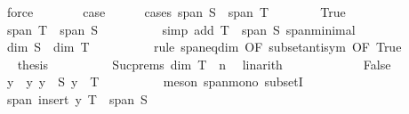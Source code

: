 \begin{isabellebody}
\ force\isanewline
\ \ \ \ \isamarkupfalse%
\ \isamarkupfalse%
\ {\isacharquery}{\kern0pt}case\isanewline
\ \ \ \ \isamarkupfalse%
\ {\isacharparenleft}{\kern0pt}cases\ {\isachardoublequoteopen}span\ S\ {\isasymsubseteq}\ span\ T{\isachardoublequoteclose}{\isacharparenright}{\kern0pt}\isanewline
\ \ \ \ \ \ \isamarkupfalse%
\ True\isanewline
\ \ \ \ \ \ \isamarkupfalse%
\ {\isachardoublequoteopen}span\ T\ {\isasymsubseteq}\ span\ S{\isachardoublequoteclose}\isanewline
\ \ \ \ \ \ \ \ \isamarkupfalse%
\ {\isacharparenleft}{\kern0pt}simp\ add{\isacharcolon}{\kern0pt}\ {\isacartoucheopen}T\ {\isasymsubseteq}\ span\ S{\isacartoucheclose}\ span{\isacharunderscore}{\kern0pt}minimal{\isacharparenright}{\kern0pt}\isanewline
\ \ \ \ \ \ \isamarkupfalse%
\ \isamarkupfalse%
\ {\isachardoublequoteopen}dim\ S\ {\isacharequal}{\kern0pt}\ dim\ T{\isachardoublequoteclose}\isanewline
\ \ \ \ \ \ \ \ \isamarkupfalse%
\ {\isacharparenleft}{\kern0pt}rule\ span{\isacharunderscore}{\kern0pt}eq{\isacharunderscore}{\kern0pt}dim\ {\isacharbrackleft}{\kern0pt}OF\ subset{\isacharunderscore}{\kern0pt}antisym\ {\isacharbrackleft}{\kern0pt}OF\ True{\isacharbrackright}{\kern0pt}{\isacharbrackright}{\kern0pt}{\isacharparenright}{\kern0pt}\isanewline
\ \ \ \ \ \ \isamarkupfalse%
\ \isamarkupfalse%
\ {\isacharquery}{\kern0pt}thesis\isanewline
\ \ \ \ \ \ \ \ \isamarkupfalse%
\ Suc{\isachardot}{\kern0pt}prems\ {\isacartoucheopen}dim\ T\ {\isacharequal}{\kern0pt}\ n{\isacartoucheclose}\ \isamarkupfalse%
\ linarith\isanewline
\ \ \ \ \isamarkupfalse%
\isanewline
\ \ \ \ \ \ \isamarkupfalse%
\ False\isanewline
\ \ \ \ \ \ \isamarkupfalse%
\ \isamarkupfalse%
\ y\ \ y{\isacharcolon}{\kern0pt}\ {\isachardoublequoteopen}y\ {\isasymin}\ S{\isachardoublequoteclose}\ {\isachardoublequoteopen}y\ {\isasymnotin}\ T{\isachardoublequoteclose}\isanewline
\ \ \ \ \ \ \ \ \isamarkupfalse%
\ {\isacharparenleft}{\kern0pt}meson\ span{\isacharunderscore}{\kern0pt}mono\ subsetI{\isacharparenright}{\kern0pt}\isanewline
\ \ \ \ \ \ \isamarkupfalse%
\ \isamarkupfalse%
\ {\isachardoublequoteopen}span\ {\isacharparenleft}{\kern0pt}insert\ y\ T{\isacharparenright}{\kern0pt}\ {\isasymsubseteq}\ span\ S{\isachardoublequoteclose}\isanewline
\ \ \ \ \ \ \ \ \isamarkupfalse%

\end{isabellebody}
